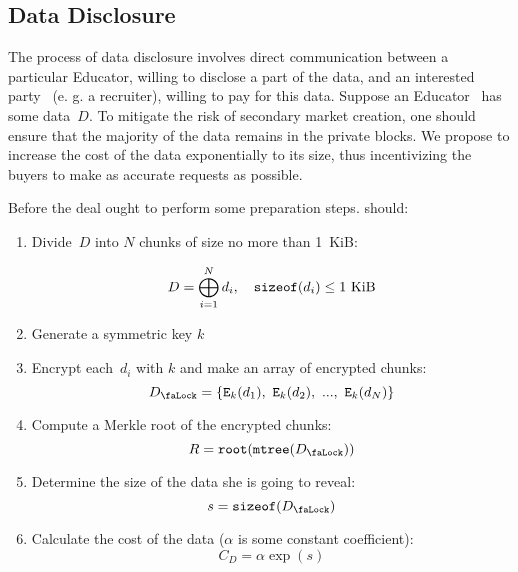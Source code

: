 \subsection{Data Disclosure}
\label{sec:DataDisclosure}
The process of data disclosure involves direct communication between a particular Educator, willing to disclose a part of the data, and an interested party~ (e. g. a recruiter), willing to pay for this data. Suppose an Educator~ has some data~$D$. To mitigate the risk of secondary market creation, one should ensure that the majority of the data remains in the private blocks. We propose to increase the cost of the data exponentially to its size, thus incentivizing the buyers to make as accurate requests as possible.

 Before the deal  ought to perform some preparation steps.  should:
\begin{enumerate}
\item Divide~$D$ into $N$ chunks of size no more than 1~KiB:

\begin{equation}
D = \bigoplus_{i=1}^N d_i, \quad \mathtt{sizeof}(d_i) \leq 1~\mathrm{KiB}
\end{equation}

\item Generate a symmetric key $k$
\item Encrypt each~$d_i$ with $k$ and make an array of encrypted chunks:
\begin{equation}
\Lock{D} = \{ \Encrypt_\Key{k}(d_1),\ \Encrypt_\Key{k}(d_2),\ ...,\ \Encrypt_\Key{k}(d_N) \}
\end{equation}

\item Compute a Merkle root of the encrypted chunks:
\begin{equation}
R = \Root(\MerkleTree(\Lock{D}))
\end{equation}

\item Determine the size of the data she is going to reveal:
\begin{equation}
s = \SizeOf(\Lock{D})
\end{equation}

\item Calculate the cost of the data ($\alpha$ is some constant coefficient):
\begin{equation}
C_D = \alpha \operatorname{exp}(s)
\end{equation}
\end{enumerate}

